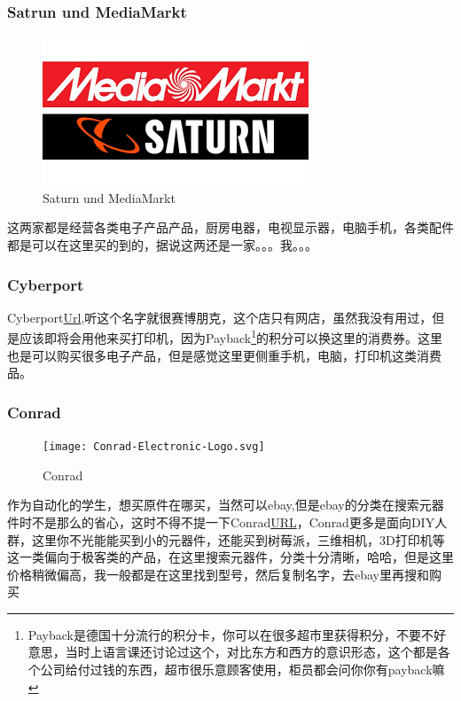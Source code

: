 \documentclass[doku]{subfiles}
\begin{document}
	\subsubsection{Satrun und MediaMarkt}
	\begin{figure}
		\centering
		\includegraphics[width=0.6\linewidth]{saturnMedia}
		\caption{Saturn und MediaMarkt}
		\label{fig:saturnmedia}
	\end{figure}
	
	这两家都是经营各类电子产品产品，厨房电器，电视显示器，电脑手机，各类配件都是可以在这里买的到的，据说这两还是一家。。。我。。。
	
	\subsubsection{Cyberport}
	Cyberport\href{https://www.cyberport.de/}{Url},听这个名字就很赛博朋克，这个店只有网店，虽然我没有用过，但是应该即将会用他来买打印机，因为Payback\footnote{Payback是德国十分流行的积分卡，你可以在很多超市里获得积分，不要不好意思，当时上语言课还讨论过这个，对比东方和西方的意识形态，这个都是各个公司给付过钱的东西，超市很乐意顾客使用，柜员都会问你你有payback嘛}的积分可以换这里的消费券。这里也是可以购买很多电子产品，但是感觉这里更侧重手机，电脑，打印机这类消费品。
	
	\subsubsection{Conrad}
	\begin{figure}[h]
		\centering
		\texttt{[image: Conrad-Electronic-Logo.svg]}
		\caption{Conrad}
		\label{fig:conrad-electronic-logo}
	\end{figure}
	
	作为自动化的学生，想买原件在哪买，当然可以ebay,但是ebay的分类在搜索元器件时不是那么的省心，这时不得不提一下Conrad\href{https://www.conrad.de/}{URL}，Conrad更多是面向DIY人群，这里你不光能能买到小的元器件，还能买到树莓派，三维相机，3D打印机等这一类偏向于极客类的产品，在这里搜索元器件，分类十分清晰，哈哈，但是这里价格稍微偏高，我一般都是在这里找到型号，然后复制名字，去ebay里再搜和购买~\label{conrad}
	
\end{document}
